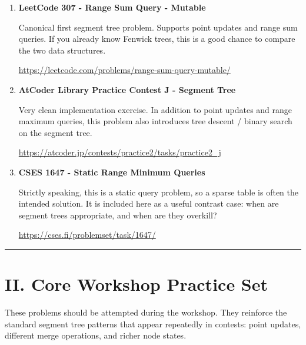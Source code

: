 \documentclass[11pt]{article}
\begin{document}
\begin{enumerate}
    \item \textbf{LeetCode 307 - Range Sum Query - Mutable}

    Canonical first segment tree problem. Supports point updates and range sum
    queries. If you already know Fenwick trees, this is a good chance to
    compare the two data structures.

    \vspace{0.3em}
    {\url{https://leetcode.com/problems/range-sum-query-mutable/}}

    \vspace{0.8em}

    \item \textbf{AtCoder Library Practice Contest J - Segment Tree}

    Very clean implementation exercise. In addition to point updates and range
    maximum queries, this problem also introduces tree descent / binary search
    on the segment tree.

    \vspace{0.3em}
    {\url{https://atcoder.jp/contests/practice2/tasks/practice2_j}}

    \vspace{0.8em}

    \item \textbf{CSES 1647 - Static Range Minimum Queries}

    Strictly speaking, this is a static query problem, so a sparse table is
    often the intended solution. It is included here as a useful contrast case:
    when are segment trees appropriate, and when are they overkill?

    \vspace{0.3em}
    {\url{https://cses.fi/problemset/task/1647/}}

    \vspace{0.8em}

\end{enumerate}

\vspace{1em}
\hrule
\vspace{1em}

\section*{II. Core Workshop Practice Set}

These problems should be attempted during the workshop.
They reinforce the standard segment tree patterns that appear repeatedly in
contests: point updates, different merge operations, and richer node states.
\end{document}
